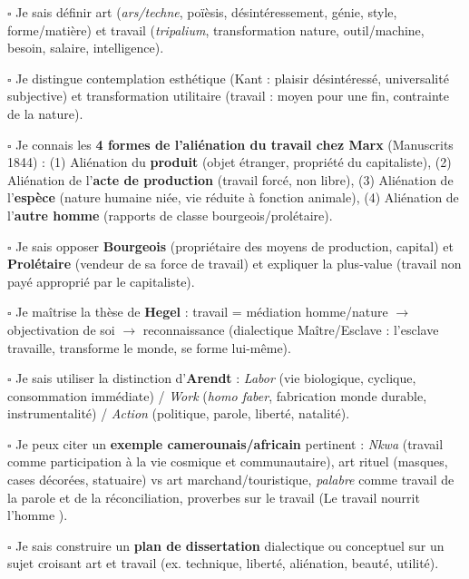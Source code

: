 \documentclass[11pt]{article}
\newcommand{\cle}[1]{{\popxbold\color{popdark}#1}}
\begin{document}
\begin{aretenir}
$\square$ Je sais définir \cle{art} (\emph{ars/techne}, poïèsis, désintéressement, génie, style, forme/matière) et \cle{travail} (\emph{tripalium}, transformation nature, outil/machine, besoin, salaire, intelligence).\par
$\square$ Je distingue \cle{contemplation esthétique} (Kant : plaisir désintéressé, universalité subjective) et \cle{transformation utilitaire} (travail : moyen pour une fin, contrainte de la nature).\par
$\square$ Je connais les \textbf{4 formes de l'aliénation du travail chez Marx} (Manuscrits 1844) : (1) Aliénation du \textbf{produit} (objet étranger, propriété du capitaliste), (2) Aliénation de l'\textbf{acte de production} (travail forcé, non libre), (3) Aliénation de l'\textbf{espèce} (nature humaine niée, vie réduite à fonction animale), (4) Aliénation de l'\textbf{autre homme} (rapports de classe bourgeois/prolétaire).\par
$\square$ Je sais opposer \textbf{Bourgeois} (propriétaire des moyens de production, capital) et \textbf{Prolétaire} (vendeur de sa force de travail) et expliquer la \cle{plus-value} (travail non payé approprié par le capitaliste).\par
$\square$ Je maîtrise la thèse de \textbf{Hegel} : travail = médiation homme/nature $\rightarrow$ objectivation de soi $\rightarrow$ reconnaissance (dialectique Maître/Esclave : l'esclave travaille, transforme le monde, se forme lui-même).\par
$\square$ Je sais utiliser la distinction d'\textbf{Arendt} : \emph{Labor} (vie biologique, cyclique, consommation immédiate) / \emph{Work} (\emph{homo faber}, fabrication monde durable, instrumentalité) / \emph{Action} (politique, parole, liberté, natalité).\par
$\square$ Je peux citer un \textbf{exemple camerounais/africain} pertinent : \emph{Nkwa} (travail comme participation à la vie cosmique et communautaire), art rituel (masques, cases décorées, statuaire) vs art marchand/touristique, \emph{palabre} comme travail de la parole et de la réconciliation, proverbes sur le travail (\guillemotleft Le travail nourrit l'homme \guillemotright).\par
$\square$ Je sais construire un \textbf{plan de dissertation} dialectique ou conceptuel sur un sujet croisant art et travail (ex. technique, liberté, aliénation, beauté, utilité).\par

\end{aretenir}
\end{document}
